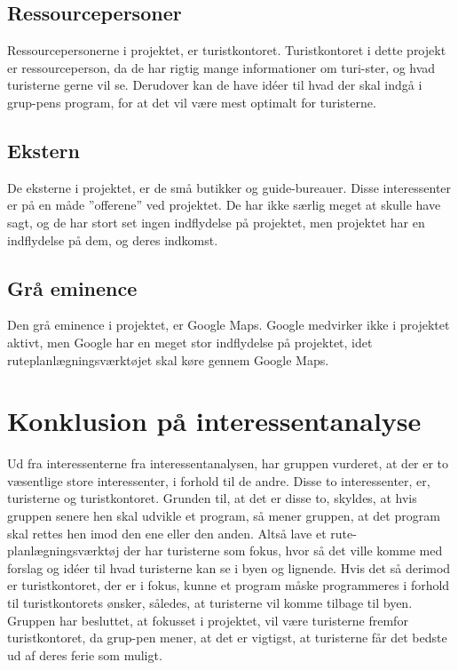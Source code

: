 \subsection{Ressourcepersoner}
Ressourcepersonerne i projektet, er turistkontoret.
Turistkontoret i dette projekt er ressourceperson, da de har rigtig mange informationer om turi-ster, og hvad turisterne gerne vil se. Derudover kan de have idéer til hvad der skal indgå i grup-pens program, for at det vil være mest optimalt for turisterne.   

\subsection{Ekstern}
De eksterne i projektet, er de små butikker og guide-bureauer.
Disse interessenter er på en måde ”offerene” ved projektet. De har ikke særlig meget at skulle have sagt, og de har stort set ingen indflydelse på projektet, men projektet har en indflydelse på dem, og deres indkomst. 

\subsection{Grå eminence}
Den grå eminence i projektet, er Google Maps.
Google medvirker ikke i projektet aktivt, men Google har en meget stor indflydelse på projektet, idet ruteplanlægningsværktøjet skal køre gennem Google Maps. 

 
\section{Konklusion på interessentanalyse}

Ud fra interessenterne fra interessentanalysen, har gruppen vurderet, at der er to væsentlige store interessenter, i forhold til de andre. Disse to interessenter, er, turisterne og turistkontoret. 
Grunden til, at det er disse to, skyldes, at hvis gruppen senere hen skal udvikle et program, så mener gruppen, at det program skal rettes hen imod den ene eller den anden. Altså lave et rute-planlægningsværktøj der har turisterne som fokus, hvor så det ville komme med forslag og idéer til hvad turisterne kan se i byen og lignende. Hvis det så derimod er turistkontoret, der er i fokus, kunne et program måske programmeres i forhold til turistkontorets ønsker, således, at turisterne vil komme tilbage til byen. 
Gruppen har besluttet, at fokusset i projektet, vil være turisterne fremfor turistkontoret, da grup-pen mener, at det er vigtigst, at turisterne får det bedste ud af deres ferie som muligt. 
 

